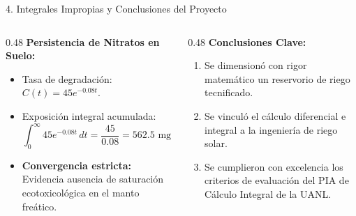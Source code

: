 \documentclass[
  spanish,
  aspectratio=169,
  xcolor={dvipsnames,table}
]{beamer}
\begin{document}
\begin{frame}{4. Integrales Impropias y Conclusiones del Proyecto}
  \begin{columns}[T]
    \begin{column}{0.48\textwidth}
      \textbf{\color{uanlblue}Persistencia de Nitratos en Suelo:}
      \begin{itemize}
        \item Tasa de degradación: $C(t) = 45 e^{-0.08 t}$.
        \item Exposición integral acumulada:
          $$\int_{0}^{\infty} 45 e^{-0.08 t}\,dt = \frac{45}{0.08} = 562.5\text{ mg}\cdot\text{día/L}$$
        \item \textbf{Convergencia estricta:} Evidencia ausencia de saturación ecotoxicológica en el manto freático.
      \end{itemize}
    \end{column}
    \begin{column}{0.48\textwidth}
      \textbf{\color{uanlblue}Conclusiones Clave:}
      \begin{enumerate}
        \item Se dimensionó con rigor matemático un reservorio de riego tecnificado.
        \item Se vinculó el cálculo diferencial e integral a la ingeniería de riego solar.
        \item Se cumplieron con excelencia los criterios de evaluación del PIA de Cálculo Integral de la UANL.
      \end{enumerate}
    \end{column}
  \end{columns}
\end{frame}
\end{document}

